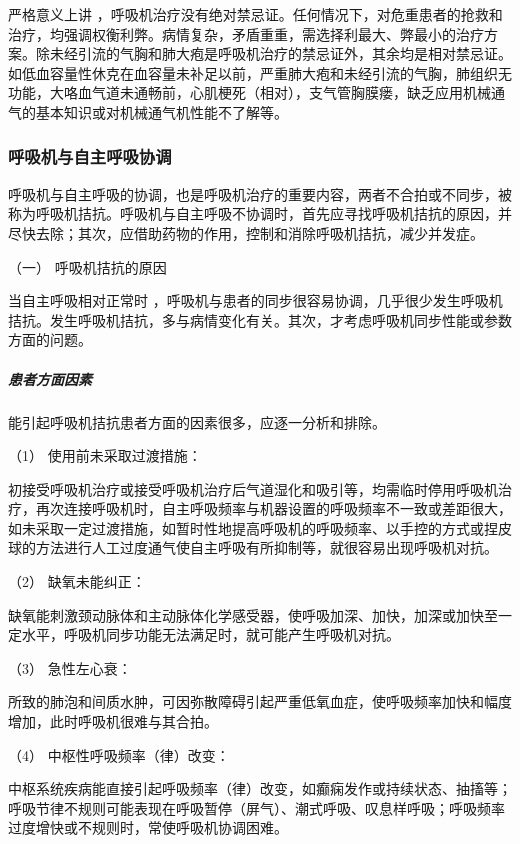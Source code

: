 严格意义上讲
，呼吸机治疗没有绝对禁忌证。任何情况下，对危重患者的抢救和治疗，均强调权衡利弊。病情复杂，矛盾重重，需选择利最大、弊最小的治疗方案。除未经引流的气胸和肺大疱是呼吸机治疗的禁忌证外，其余均是相对禁忌证。如低血容量性休克在血容量未补足以前，严重肺大疱和未经引流的气胸，肺组织无功能，大咯血气道未通畅前，心肌梗死（相对），支气管胸膜瘘，缺乏应用机械通气的基本知识或对机械通气机性能不了解等。

\subsubsection{呼吸机与自主呼吸协调}

呼吸机与自主呼吸的协调，也是呼吸机治疗的重要内容，两者不合拍或不同步，被称为呼吸机拮抗。呼吸机与自主呼吸不协调时，首先应寻找呼吸机拮抗的原因，并尽快去除；其次，应借助药物的作用，控制和消除呼吸机拮抗，减少并发症。

\hypertarget{text00371.htmlux5cux23CHP16-3-5-2-1}{}
（一） 呼吸机拮抗的原因

当自主呼吸相对正常时
，呼吸机与患者的同步很容易协调，几乎很少发生呼吸机拮抗。发生呼吸机拮抗，多与病情变化有关。其次，才考虑呼吸机同步性能或参数方面的问题。

\subparagraph{患者方面因素}

能引起呼吸机拮抗患者方面的因素很多，应逐一分析和排除。

\hypertarget{text00371.htmlux5cux23CHP16-3-5-2-1-1-1}{}
（1） 使用前未采取过渡措施：

初接受呼吸机治疗或接受呼吸机治疗后气道湿化和吸引等，均需临时停用呼吸机治疗，再次连接呼吸机时，自主呼吸频率与机器设置的呼吸频率不一致或差距很大，如未采取一定过渡措施，如暂时性地提高呼吸机的呼吸频率、以手控的方式或捏皮球的方法进行人工过度通气使自主呼吸有所抑制等，就很容易出现呼吸机对抗。

\hypertarget{text00371.htmlux5cux23CHP16-3-5-2-1-1-2}{}
（2） 缺氧未能纠正：

缺氧能刺激颈动脉体和主动脉体化学感受器，使呼吸加深、加快，加深或加快至一定水平，呼吸机同步功能无法满足时，就可能产生呼吸机对抗。

\hypertarget{text00371.htmlux5cux23CHP16-3-5-2-1-1-3}{}
（3） 急性左心衰：

所致的肺泡和间质水肿，可因弥散障碍引起严重低氧血症，使呼吸频率加快和幅度增加，此时呼吸机很难与其合拍。

\hypertarget{text00371.htmlux5cux23CHP16-3-5-2-1-1-4}{}
（4） 中枢性呼吸频率（律）改变：

中枢系统疾病能直接引起呼吸频率（律）改变，如癫痫发作或持续状态、抽搐等；呼吸节律不规则可能表现在呼吸暂停（屏气）、潮式呼吸、叹息样呼吸；呼吸频率过度增快或不规则时，常使呼吸机协调困难。

